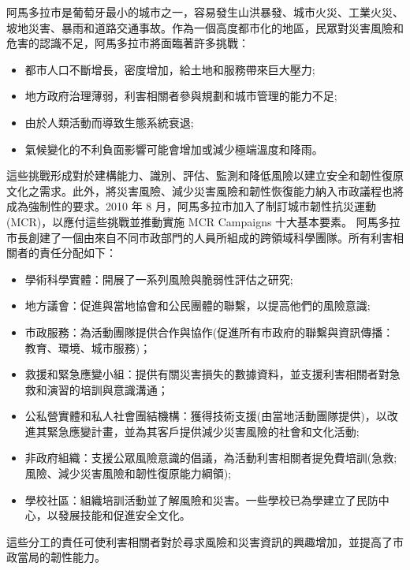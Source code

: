 \documentclass[a4paper,12pt]{article}
\begin{document}
\begin{enumerate}
阿馬多拉市是葡萄牙最小的城市之一，容易發生山洪暴發、城市火災、工業火災、坡地災害、暴雨和道路交通事故。作為一個高度都市化的地區，民眾對災害風險和危害的認識不足，阿馬多拉市將面臨著許多挑戰：\\
\begin{itemize}
\item 都市人口不斷增長，密度增加，給土地和服務帶來巨大壓力;\\
\item 地方政府治理薄弱，利害相關者參與規劃和城市管理的能力不足;\\
\item 由於人類活動而導致生態系統衰退;\\
\item 氣候變化的不利負面影響可能會增加或減少極端溫度和降雨。\\
\end{itemize}
這些挑戰形成對於建構能力、識別、評估、監測和降低風險以建立安全和韌性復原文化之需求。此外，將災害風險、減少災害風險和韌性恢復能力納入市政議程也將成為強制性的要求。2010 年 8 月，阿馬多拉市加入了制訂城市韌性抗災運動(MCR)，以應付這些挑戰並推動實施 MCR Campaigns 十大基本要素。 阿馬多拉市長創建了一個由來自不同市政部門的人員所組成的跨領域科學團隊。所有利害相關者的責任分配如下：\\
\begin{itemize}
\item 學術科學實體：開展了一系列風險與脆弱性評估之研究;\\
\item 地方議會：促進與當地協會和公民團體的聯繫，以提高他們的風險意識;\\
\item 市政服務：為活動團隊提供合作與協作(促進所有市政府的聯繫與資訊傳播：教育、環境、城市服務)；\\
\item 救援和緊急應變小組：提供有關災害損失的數據資料，並支援利害相關者對急救和演習的培訓與意識溝通；\\
\item 公私營實體和私人社會團結機構：獲得技術支援(由當地活動團隊提供)，以改進其緊急應變計畫，並為其客戶提供減少災害風險的社會和文化活動;\\
\item 非政府組織：支援公眾風險意識的倡議，為活動利害相關者提免費培訓(急救;風險、減少災害風險和韌性復原能力綱領);\\
\item 學校社區：組織培訓活動並了解風險和災害。一些學校已為學建立了民防中心，以發展技能和促進安全文化。\\
\end{itemize}

這些分工的責任可使利害相關者對於尋求風險和災害資訊的興趣增加，並提高了市政當局的韌性能力。\\
\newpage
\end{enumerate}
\end{document}
